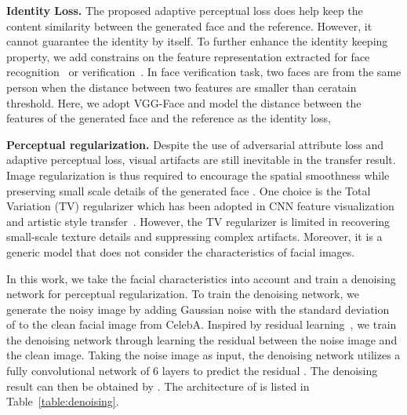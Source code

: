 \documentclass[journal]{IEEEtran}
\begin{document}
\textbf{Identity Loss.}\quad
The proposed adaptive perceptual loss does help keep the content similarity between the generated face and the reference. However, it cannot guarantee the identity by itself. To further enhance the identity keeping property, we add constrains on the feature representation extracted for face recognition~\cite{huo2018heterogeneous} or verification~\cite{zheng2018pairwise}. In face verification task, two faces are from the same person when the distance between two features are smaller than ceratain threshold. Here, we adopt VGG-Face and model the distance between the features of the generated face and the reference as the identity loss,












\textbf{Perceptual regularization.}\quad
Despite the use of adversarial attribute loss and adaptive perceptual loss, visual artifacts are still inevitable in the transfer result.
Image regularization is thus required to encourage the spatial smoothness while preserving small scale details of the generated face .
One choice is the Total Variation (TV) regularizer which has been adopted in CNN feature visualization~\cite{mahendran2015understanding} and artistic style transfer~\cite{gatys2015style,johnson2016perceptual}.
However, the TV regularizer is limited in recovering small-scale texture details and suppressing complex artifacts.
Moreover, it is a generic model that does not consider the characteristics of facial images.



In this work, we take the facial characteristics into account and train a denoising network for perceptual regularization.
To train the denoising network, we generate the noisy image by adding Gaussian noise with the standard deviation of  to the clean facial image from CelebA.
Inspired by residual learning~\cite{zhang2017beyond}, we train the denoising network through learning the residual between the noise image and the clean image.
Taking the noise image  as input, the denoising network utilizes a fully convolutional network of 6 layers to predict the residual .
The denoising result can then be obtained by . The architecture of  is listed in Table~\ref{table:denoising}.
\end{document}
